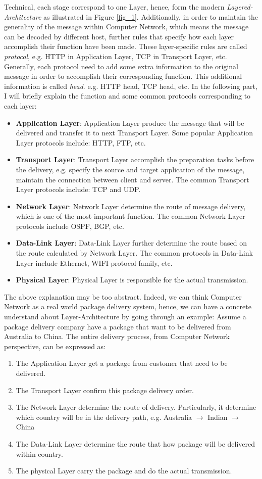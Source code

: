 \documentclass[10pt,a4paper]{article}
\begin{document}
Technical, each stage correspond to one Layer, hence, form the modern \textit{Layered-Architecture} as illustrated in Figure \ref{fig_1}. Additionally, in order to maintain the generality of the message within Computer Network, which means the message can be decoded by different host, further rules that specify how each layer accomplish their function have been made. These layer-specific rules are called \textit{protocol}, \textsf{e.g.} HTTP in Application Layer, TCP in Transport Layer, etc. Generally, each protocol need to add some extra information to the original message in order to accomplish their corresponding function. This additional information is called \textit{head}. \textsf{e.g.} HTTP head, TCP head, etc. In the following part, I will briefly explain the function and some common protocols corresponding to each layer:
\begin{itemize}
	\item \textbf{Application Layer}: Application Layer produce the message that will be delivered and transfer it to next Transport Layer. Some popular Application Layer protocols include: HTTP, FTP, etc.
	\item \textbf{Transport Layer}: Transport Layer accomplish the preparation tasks before the delivery, e.g. specify the source and target application of the message, maintain the connection between client and server. The common Transport Layer protocols include: TCP and UDP.
	\item \textbf{Network Layer}: Network Layer determine the route of message delivery, which is one of the most important function. The common Network Layer protocols include OSPF, BGP, etc.
	\item \textbf{Data-Link Layer}: Data-Link Layer further determine the route based on the route calculated by Network Layer. The common protocols in Data-Link Layer include Ethernet, WIFI protocol family, etc.
	\item \textbf{Physical Layer}: Physical Layer is responsible for the actual  transmission.  
\end{itemize}
The above explanation may be too abstract. Indeed, we can think Computer Network as a real world package delivery system, hence, we can have a concrete understand about Layer-Architecture by going through an example: Assume a package delivery company have a package that want to be delivered from Australia to China. The entire delivery process, from Computer Network perspective, can be expressed as:
\begin{enumerate}
	\item The Application Layer get a package from customer that need to be delivered.
	\item The Transport Layer confirm this package delivery order.
	\item The Network Layer determine the route of delivery. Particularly, it determine  which country will be in the delivery path, e.g. Australia $\rightarrow$ Indian $\rightarrow$ China
	\item The Data-Link Layer determine the route that how package will be delivered within country.
	\item The physical Layer carry the package and do the actual transmission.
\end{enumerate}
\end{document}

